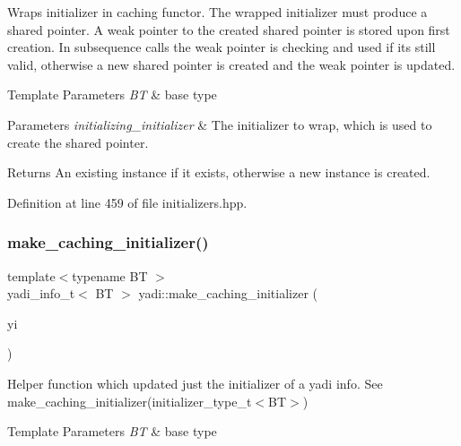 Wraps initializer in caching functor. The wrapped initializer must produce a shared pointer. A weak pointer to the created shared pointer is stored upon first creation. In subsequence calls the weak pointer is checking and used if it\textquotesingle{}s still valid, otherwise a new shared pointer is created and the weak pointer is updated. 


\begin{DoxyTemplParams}{Template Parameters}
{\em BT} & base type \\
\hline
\end{DoxyTemplParams}

\begin{DoxyParams}{Parameters}
{\em initializing\+\_\+initializer} & The initializer to wrap, which is used to create the shared pointer. \\
\hline
\end{DoxyParams}
\begin{DoxyReturn}{Returns}
An existing instance if it exists, otherwise a new instance is created. 
\end{DoxyReturn}


Definition at line 459 of file initializers.\+hpp.

\mbox{\label{namespaceyadi_a71eac695c975b9f2b7f9d9611725b94e}} 
\subsubsection{\texorpdfstring{make\+\_\+caching\+\_\+initializer()}{make\_caching\_initializer()}\hspace{0.1cm}{\footnotesize\ttfamily [2/2]}}
{\footnotesize\ttfamily template$<$typename BT $>$ \\
yadi\+\_\+info\+\_\+t$<$ BT $>$ yadi\+::make\+\_\+caching\+\_\+initializer (\begin{DoxyParamCaption}\item[{yadi\+\_\+info\+\_\+t$<$ BT $>$}]{yi }\end{DoxyParamCaption})}



Helper function which updated just the initializer of a yadi info. See make\+\_\+caching\+\_\+initializer(initializer\+\_\+type\+\_\+t$<$\+B\+T$>$) 


\begin{DoxyTemplParams}{Template Parameters}
{\em BT} & base type \\
\hline
\end{DoxyTemplParams}

